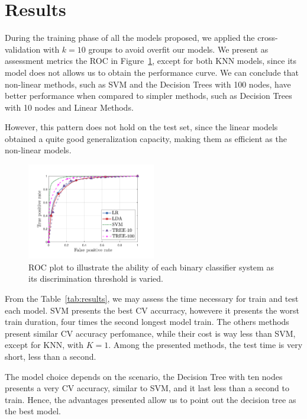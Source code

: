 
\section{Results}

During the training phase of all the models proposed, we applied the cross-validation 
with $k=10$ groups to avoid overfit our models. We present as assessment metrics 
the ROC in Figure~\ref{fig:ROC}, except for both KNN models, since its model does not 
allows us to obtain the performance curve. We can conclude that non-linear methods, such as SVM and the Decision Trees with 100 nodes, have better performance when compared to simpler methods, such as Decision Trees with 10 nodes and Linear Methods.

However, this pattern does not hold on the test set, since the linear models obtained 
a quite good generalization capacity, making them as efficient as the non-linear models.

\begin{figure}[htbp!]
  \centerline{\includegraphics[width=0.5\textwidth]{../../code/hw3/matlab/figures/ROC.pdf}}
  \caption{ROC plot to illustrate the ability of each binary classifier system as its discrimination threshold is varied.}
  \label{fig:ROC}
\end{figure}

From the Table~\ref{tab:results}, we may assess the time necessary for train and test each model. SVM presents the best CV accurracy, howevere it presents the worst train duration, four times the second longest model train. The others methods present similar CV accuracy perfomance, while their cost is way less than SVM, except for KNN, with $K=1$. 
Among the presented methods, the test time is very short, less than a second.

The model choice depends on the scenario, the Decision Tree with ten nodes presents a very CV accuracy, similar to SVM, and it last less than a second to train. Hence, the advantages presented allow us to point out the decision tree as the best model.